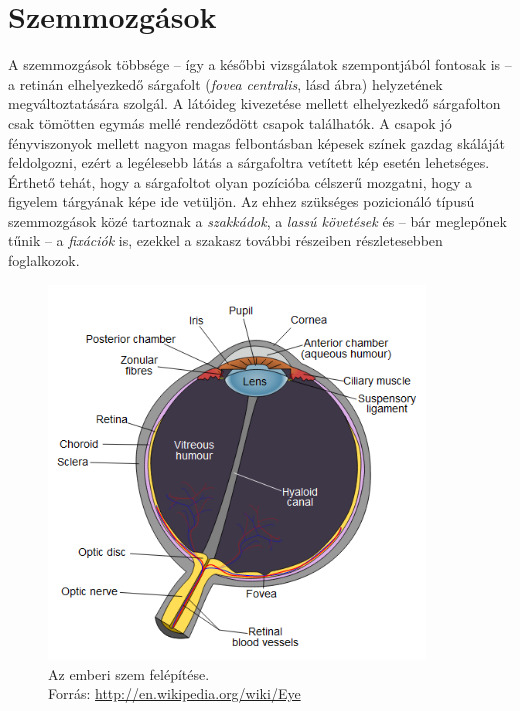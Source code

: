 \section{Szemmozgások}\label{sect:osztalyozas}


A szemmozgások többsége -- így a későbbi vizsgálatok szempontjából fontosak is -- a retinán elhelyezkedő sárgafolt (\emph{fovea centralis}, lásd  ábra) helyzetének megváltoztatására szolgál. A látóideg kivezetése mellett elhelyezkedő sárgafolton csak tömötten egymás mellé rendeződött csapok találhatók. A csapok jó fényviszonyok mellett nagyon magas felbontásban képesek színek gazdag skáláját feldolgozni, ezért a legélesebb látás a sárgafoltra vetített kép esetén lehetséges. Érthető tehát, hogy a sárgafoltot olyan pozícióba célszerű mozgatni, hogy a figyelem tárgyának képe ide vetüljön. Az ehhez szükséges pozicionáló típusú szemmozgások közé tartoznak a \emph{szakkádok}, a \emph{lassú követések} és -- bár meglepőnek tűnik -- a \emph{fixációk} is, ezekkel a szakasz további részeiben részletesebben foglalkozok.

\begin{figure}[!ht]
\centering
\includegraphics[width=100mm, keepaspectratio]{figures/eye_diagram.png}
\caption{Az emberi szem felépítése.\\Forrás: \url{http://en.wikipedia.org/wiki/Eye}}
\label{fig:eyediag}
\end{figure}

